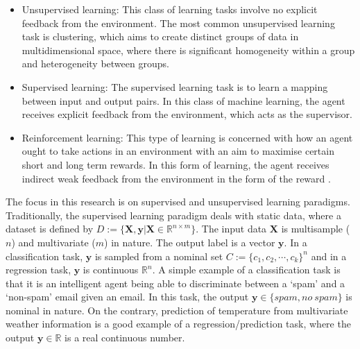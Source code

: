 \begin{itemize}
	\item Unsupervised learning: This class of learning tasks involve no explicit feedback from the environment. The most common unsupervised learning task is clustering, which aims to create distinct groups of data in multidimensional space, where there is significant homogeneity within a group and heterogeneity between groups.  
	\item Supervised learning: The supervised learning task is to learn a mapping between input and output pairs. In this class of machine learning, the agent receives explicit feedback from the environment, which acts as the supervisor. 
	\item Reinforcement learning: This type of learning is concerned with how an agent ought to take actions in an environment with an aim to maximise certain short and long term rewards. In this form of learning, the agent receives indirect weak feedback from the environment in the form of the reward \citep{sutton1998reinforcement}.
\end{itemize}
The focus in this research is on supervised and unsupervised learning paradigms. Traditionally, the supervised learning paradigm deals with static data, where a dataset is defined by  $D:=\{\mathbf{X},\mathbf{y}|\mathbf{X}\in \mathbb{R}^{n\times m}\}$. The input data $\mathbf{X}$ is multisample ($n$) and multivariate ($m$) in nature. The output label is a vector $\mathbf{y}$. In a classification task, $\mathbf{y}$ is sampled from a nominal set $C:= \{c_1,c_2,\cdots,c_k\}^n$ and in a regression task, $\mathbf{y}$ is continuous $\mathbb{R}^n$. A simple example of a classification task is that it is an intelligent agent being able to discriminate between a `spam' and a `non-spam' email given an email. In this task, the output $\mathbf{y}\in \{spam, no\ spam\}$ is nominal in nature. On the contrary, prediction of temperature from multivariate weather information is a good example of a regression/prediction task, where the output $\mathbf{y}\in \mathbb{R}$ is a real continuous number. 

